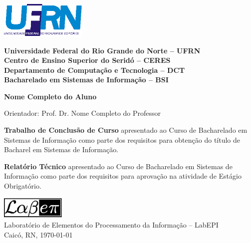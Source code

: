\begin{titlepage}

\begin{center}

\small

\parbox{0.33\textwidth}{%
\includegraphics[width=0.31\textwidth]{image/ufrn.eps}}%
\parbox{0.67\textwidth}{%
\begin{center}%
\textbf{%
Universidade Federal do Rio Grande do Norte -- UFRN\\
Centro de Ensino Superior do Seridó -- CERES\\
Departamento de Computação e Tecnologia -- DCT\\
Bacharelado em Sistemas de Informação -- BSI}
\end{center}}

\vfill

\LARGE

\textbf{\titulo}

\vfill

\Large

\textbf{Nome Completo do Aluno}

\vfill

\normalsize

Orientador: Prof. Dr. Nome Completo do Professor

\vfill

\hfill
\if\doctype\doctypem           %
\parbox{0.5\linewidth}{%
{\bf Trabalho de Conclusão de Curso} apresentado ao Curso de Bacharelado em
Sistemas de Informação como parte dos requisitos para obtenção do título de
Bacharel em Sistemas de Informação.}
\fi
\if\doctype\doctyper           %
\parbox{0.5\linewidth}{%
{\bf Relatório Técnico} apresentado ao Curso de Bacharelado em Sistemas de
Informação como parte dos requisitos para aprovação na atividade de Estágio
Obrigatório.}
\fi

\vfill

\large

\includegraphics[width=0.23\textwidth]{image/labepi.eps} \\
Laboratório de Elementos do Processamento da Informação -- LabEPI \\
Caicó, RN, \today

\end{center}

\end{titlepage}

